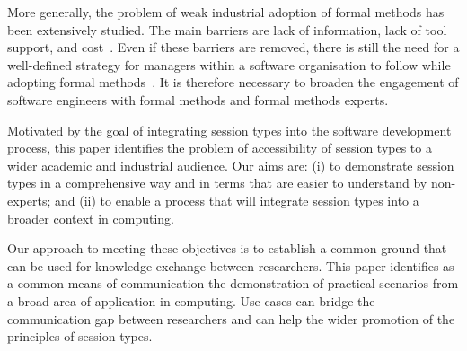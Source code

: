 More generally, the problem of weak industrial adoption of formal methods has been extensively studied.
The main barriers are lack
of information, lack of tool support, and cost~\cite{Davis2013}.
Even if these barriers are removed, there is still the need for a 
well-defined strategy for managers within a software
organisation to follow while adopting formal methods~\cite{Ponsard2013}.
It is therefore necessary to broaden the engagement of software engineers 
with formal methods and formal methods experts.

Motivated by the goal of integrating session types into
the software development process, this paper identifies the problem of accessibility
of session types to a wider academic and industrial audience. 
Our aims are:
(i) to demonstrate session types in a comprehensive way and in
terms that are easier to understand by non-experts; and
(ii) to enable a process that will
integrate session types into a broader context in computing.

Our approach to meeting these objectives is to establish a common
ground that can be used for knowledge exchange between researchers.
This paper identifies as a common means of communication the demonstration
of practical scenarios from a broad area of application in computing.
Use-cases can bridge the communication gap between researchers and can help
the wider promotion of the principles of session types.

